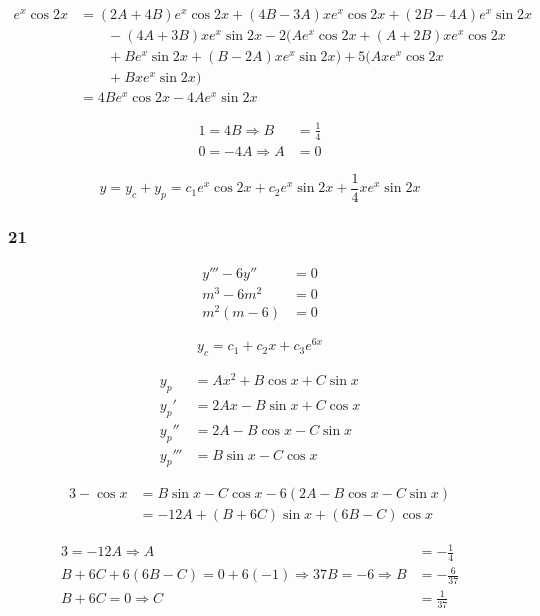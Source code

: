 \documentclass{article}
\begin{document}
\begin{align*}
  e^x \cos 2x & = (2A + 4B) e^x \cos 2x + (4B - 3A) x e^x \cos 2x + (2B - 4A) e^x \sin 2x    \\
              & \qquad - (4A + 3B) x e^x \sin 2x - 2 (A e^x \cos 2x + (A + 2B) x e^x \cos 2x \\
              & \qquad + B e^x \sin 2x + (B - 2A) x e^x \sin 2x) + 5 (A x e^x \cos 2x        \\
              & \qquad + B x e^x \sin 2x)                                                    \\
              & = 4B e^x \cos 2x- 4A e^x \sin 2x
\end{align*}

\begin{align*}
  1 = 4B \Rightarrow B  & = \frac{1}{4} \\
  0 = -4A \Rightarrow A & = 0
\end{align*}

\[y = y_c + y_p = c_1 e^x \cos 2x + c_2 e^x \sin 2x + \frac{1}{4} x e^x \sin 2x\]

\subsubsection{21}

\begin{align*}
  y''' - 6y'' & = 0 \\
  m^3 - 6m^2  & = 0 \\
  m^2 (m - 6) & = 0
\end{align*}

\[y_c = c_1 + c_2 x + c_3 e^{6x}\]

\begin{align*}
  y_p    & = A x^2 + B \cos x + C \sin x \\
  y_p'   & = 2Ax - B \sin x + C \cos x   \\
  y_p''  & = 2A - B \cos x - C \sin x    \\
  y_p''' & = B \sin x - C \cos x
\end{align*}

\begin{align*}
  3 - \cos x & = B \sin x - C \cos x - 6 (2A - B \cos x - C \sin x) \\
             & = -12A + (B + 6C) \sin x + (6B - C) \cos x
\end{align*}

\begin{align*}
  3 = -12A \Rightarrow A                                              & = -\frac{1}{4}  \\
  B + 6C + 6 (6B - C) = 0 + 6 (-1) \Rightarrow 37B = -6 \Rightarrow B & = -\frac{6}{37} \\
  B + 6C = 0 \Rightarrow C                                            & = \frac{1}{37}
\end{align*}
\end{document}
